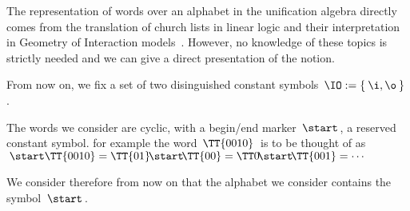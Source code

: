 The representation of words over an alphabet in the unification algebra directly comes from the translation of church lists in linear logic and their interpretation in Geometry of Interaction models~\cite{girard_geometry_1989,girard_geometry_1995}. However, no knowledge of these topics is strictly needed and we can give a direct presentation of the notion.

\medskip
From now on, we fix a set of two disinguished constant symbols $\,\IO:=\{\:\i,\o\:\}\,$.



The words we consider are cyclic, with a begin/end marker $\,\start\,$, a reserved constant symbol. for example the word $\,\TT{0010}\,$ is to be thought of as $\,\start\TT{0010}=\TT{01}\!\start\!\TT{00}=\TT0\!\start\!\TT{001}=\cdots\,$

We consider therefore from now on that the alphabet we consider contains the symbol $\,\start\,$.




